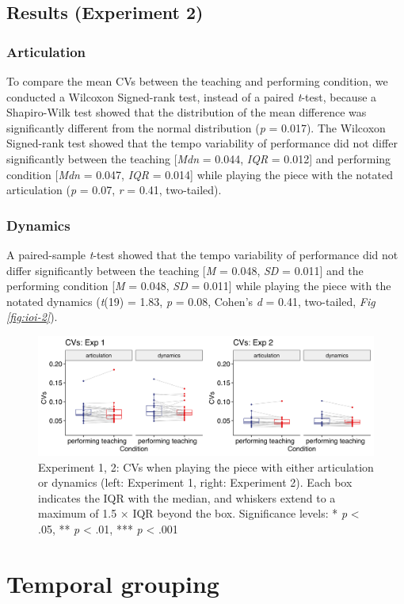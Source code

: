 \documentclass[
  man,floatsintext]{apa6}
\begin{document}
\hypertarget{results-experiment-2}{%
\subsection{Results (Experiment 2)}\label{results-experiment-2}}

\hypertarget{articulation-3}{%
\subsubsection{Articulation}\label{articulation-3}}

To compare the mean CVs between the teaching and performing condition, we conducted a Wilcoxon Signed-rank test, instead of a paired \emph{t}-test, because a Shapiro-Wilk test showed that the distribution of the mean difference was significantly different from the normal distribution (\emph{p} = 0.017). The Wilcoxon Signed-rank test showed that the tempo variability of performance did not differ significantly between the teaching {[}\emph{Mdn} = 0.044, \emph{IQR} = 0.012{]} and performing condition {[}\emph{Mdn} = 0.047, \emph{IQR} = 0.014{]} while playing the piece with the notated articulation (\emph{p} = 0.07, \emph{r} = 0.41, two-tailed).

\hypertarget{dynamics-3}{%
\subsubsection{Dynamics}\label{dynamics-3}}

A paired-sample \emph{t}-test showed that the tempo variability of performance did not differ significantly between the teaching {[}\emph{M} = 0.048, \emph{SD} = 0.011{]} and the performing condition {[}\emph{M} = 0.048, \emph{SD} = 0.011{]} while playing the piece with the notated dynamics (\emph{t}(19) = 1.83, \emph{p} = 0.08, Cohen's \emph{d} = 0.41, two-tailed, \emph{Fig \ref{fig:ioi-2}}).

\begin{figure}
\includegraphics[width=1\linewidth]{manuscript_files/figure-latex/plot-cv-1-1} \caption{\label{fig:vel-2}Experiment 1, 2: CVs when playing the piece with either articulation or dynamics (left: Experiment 1, right: Experiment 2). Each box indicates the IQR with the median, and whiskers extend to a maximum of 1.5 × IQR beyond the box. Significance levels: * \textit{p} < .05, ** \textit{p} < .01, *** \textit{p} < .001}\label{fig:plot-cv-1}
\end{figure}

\hypertarget{temporal-grouping}{%
\section{Temporal grouping}\label{temporal-grouping}}
\end{document}
